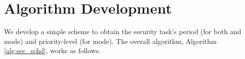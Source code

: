 \documentclass[../rt_server_main.tex]{subfiles}
\begin{document}
\section{Algorithm Development} \label{sec:algo}


We develop a simple scheme to obtain the security task's period (for both \pve and \ave mode) and priority-level (for \ave mode). The overall algorithm, Algorithm \ref{alg:sec_schd}, works as follows. 
 

	\renewcommand{\algorithmicforall}{\textbf{for each}}
    \renewcommand\algorithmiccomment[1]{%
 {\it /* {#1} */} %
}
\renewcommand{\algorithmicrequire}{\textbf{Input:}}
    \renewcommand{\algorithmicensure}{\textbf{Output:}}
    
   \newcommand{\Function}[1]{\textbf{function}~\textsc{#1}}
   \newcommand{\EndFunction}{\textbf{end function}}
   
  
    
\end{document}
